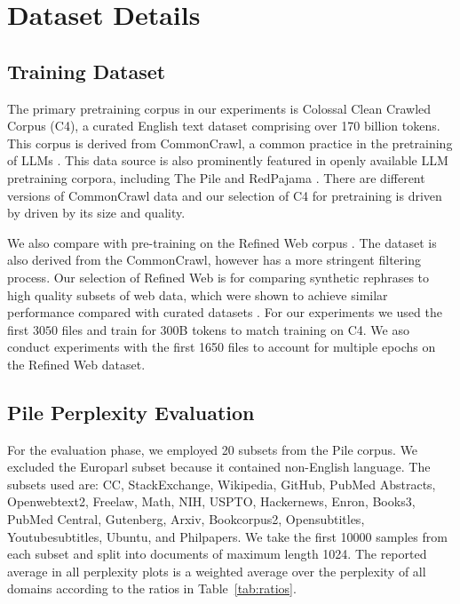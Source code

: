 \section{Dataset Details}
\subsection{Training Dataset}

The primary pretraining corpus in our experiments is Colossal Clean Crawled Corpus (C4), a curated English text dataset comprising over 170 billion tokens. This corpus is derived from CommonCrawl, a common practice in the pretraining of LLMs \cite{brown2020language,raffel2020exploring,touvron2023llama}. This data source is also prominently featured in openly available LLM pretraining corpora, including The Pile \cite{gao2020pile} and RedPajama \cite{together2023redpajama}.
 There are different versions of CommonCrawl data and our selection of C4 for pretraining is driven by driven by its size and quality.

 We also compare with pre-training on the Refined Web corpus \cite{penedo2023refinedweb}.  The dataset is also derived from the CommonCrawl, however has a more stringent filtering process. Our selection of Refined Web is for comparing synthetic rephrases to high quality subsets of web data, which were shown to achieve similar performance compared with curated datasets \cite{penedo2023refinedweb}.  For our experiments we used the first $3050$ files and train for 300B tokens to match training on C4.  We aso conduct experiments with the first 1650 files to account for multiple epochs on the Refined Web dataset.  

\subsection{Pile Perplexity Evaluation}
For the evaluation phase, we employed 20 subsets from the Pile corpus. We excluded the Europarl subset because it contained non-English language. The subsets used are:
CC, StackExchange, Wikipedia, GitHub, PubMed Abstracts, Openwebtext2, Freelaw, Math, NIH, USPTO, Hackernews, Enron, Books3, PubMed Central, Gutenberg, Arxiv, Bookcorpus2, Opensubtitles, Youtubesubtitles, Ubuntu, and Philpapers. We take the first 10000 samples from each subset and split into documents of maximum length 1024.  The reported average in all perplexity plots is a weighted average over the perplexity of all domains according to the ratios in Table~\ref{tab:ratios}.  

